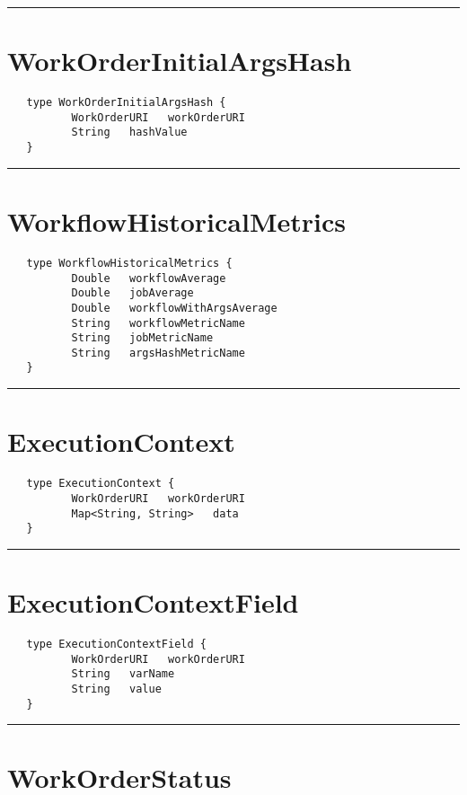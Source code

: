 \rule{12cm}{2pt}
\section{WorkOrderInitialArgsHash}
\label{type:WorkOrderInitialArgsHash}

\begin{verbatim}
   type WorkOrderInitialArgsHash {
          WorkOrderURI   workOrderURI
          String   hashValue
   }
\end{verbatim}

\rule{12cm}{2pt}
\section{WorkflowHistoricalMetrics}
\label{type:WorkflowHistoricalMetrics}

\begin{verbatim}
   type WorkflowHistoricalMetrics {
          Double   workflowAverage
          Double   jobAverage
          Double   workflowWithArgsAverage
          String   workflowMetricName
          String   jobMetricName
          String   argsHashMetricName
   }
\end{verbatim}

\rule{12cm}{2pt}
\section{ExecutionContext}
\label{type:ExecutionContext}

\begin{verbatim}
   type ExecutionContext {
          WorkOrderURI   workOrderURI
          Map<String, String>   data
   }
\end{verbatim}

\rule{12cm}{2pt}
\section{ExecutionContextField}
\label{type:ExecutionContextField}

\begin{verbatim}
   type ExecutionContextField {
          WorkOrderURI   workOrderURI
          String   varName
          String   value
   }
\end{verbatim}

\rule{12cm}{2pt}
\section{WorkOrderStatus}
\label{type:WorkOrderStatus}


